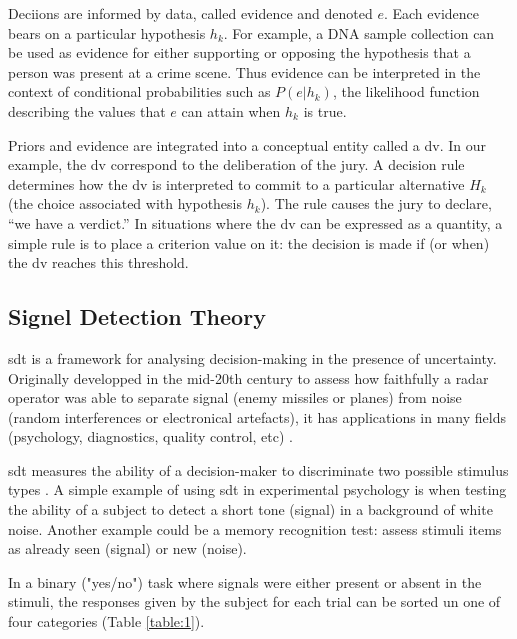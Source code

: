 Deciions are informed by data, called evidence and denoted $e$. Each evidence bears on a particular hypothesis $h_k$. For example, a DNA sample collection can be used as evidence for either supporting or opposing the hypothesis that a person was present at a crime scene. Thus evidence can be interpreted in the context of conditional probabilities such as $P(e|h_k)$, the likelihood function describing the values that $e$ can attain when $h_k$ is true.

Priors and evidence  are integrated into a conceptual entity called a \acrfull{dv}. In our example, the \acrshort{dv} correspond to the deliberation of the jury. A decision rule determines how the \acrshort{dv} is interpreted to commit to a particular alternative $H_k$ (the choice associated with hypothesis $h_k$). The rule causes the jury to declare, “we have a verdict.” In situations where the \acrshort{dv} can be expressed as a quantity, a simple rule is to place a criterion value on it: the decision is made if (or when) the \acrshort{dv} reaches this threshold.


\subsection{Signel Detection Theory}

\acrfull{sdt} is a framework for analysing \gls{decision-making} in the presence of  \gls{uncertainty}. Originally developped in the mid-20th century to assess how faithfully a radar operator was able to separate signal (enemy missiles or planes) from noise (random interferences or electronical artefacts), it has applications in many fields (psychology, diagnostics, quality control, etc) \cite{green1966signal}.

\acrshort{sdt} measures the ability of a decision-maker to discriminate two possible stimulus types \cite{stanislawCalculationSignalDetection1999}. A simple example of using \acrshort{sdt} in experimental psychology is when testing the ability of a subject to detect a short tone (signal) in a background of white noise. Another example could be a memory recognition test: assess stimuli items as already seen (signal) or new (noise).

 In a binary ("yes/no") task where signals were either present or absent in the stimuli, the responses given by the subject for each trial can be sorted un one of four categories (Table \ref{table:1}).

